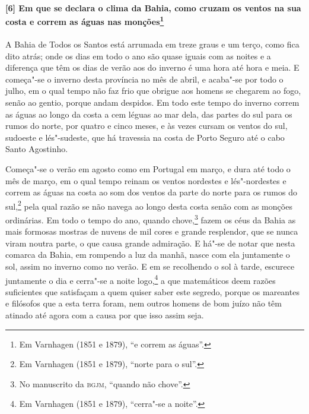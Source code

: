 \paragraph{[6] Em que se declara o clima da Bahia, como cruzam os ventos na sua costa e
correm as águas nas monções\protect\footnote{ Em Varnhagen (1851 e 1879), ``e correm as
águas''.}} \quad
A Bahia de Todos os Santos está arrumada em treze graus e um terço, como fica dito atrás;
onde os dias em todo o ano são quase iguais com as noites e a diferença que têm os dias de
verão aos do inverno é uma hora até hora e meia. E começa"-se o inverno desta província no
mês de abril, e acaba"-se por todo o julho, em o qual tempo não faz frio que obrigue aos
homens se chegarem ao fogo, senão ao gentio, porque andam despidos. Em todo este tempo do
inverno correm as águas ao longo da costa a cem léguas ao mar dela, das partes do sul para
os rumos do norte, por quatro e cinco meses, e às vezes cursam os ventos do sul, sudoeste
e lés"-sudeste, que há travessia na costa de Porto Seguro até o cabo Santo Agostinho.

Começa"-se o verão em agosto como em Portugal em março, e dura até todo o mês de março, em
o qual tempo reinam os ventos nordestes e lés"-nordestes e correm as águas na costa ao som
dos ventos da parte do norte para os rumos do sul,\footnote{ Em Varnhagen (1851 e 1879),
``norte para o sul''.} pela qual razão se não navega ao longo desta costa senão com as
monções ordinárias. Em todo o tempo do ano, quando chove,\footnote{ No manuscrito da
\textsc{bgjm}, ``quando não chove''.} fazem os céus da Bahia as mais formosas mostras de
nuvens de mil cores e grande resplendor, que se nunca viram noutra parte, o que causa
grande admiração. E há"-se de notar que nesta comarca da Bahia, em rompendo a luz da manhã,
nasce com ela juntamente o sol, assim no inverno como no verão. E em se recolhendo o sol à
tarde, escurece juntamente o dia e cerra"-se a noite logo,\footnote{ Em Varnhagen (1851 e
1879), ``cerra"-se a noite''.} a que matemáticos deem razões suficientes que satisfaçam a
quem quiser saber este segredo, porque os mareantes e filósofos que a esta terra foram,
nem outros homens de bom juízo não têm atinado até agora com a causa por que isso assim
seja.

